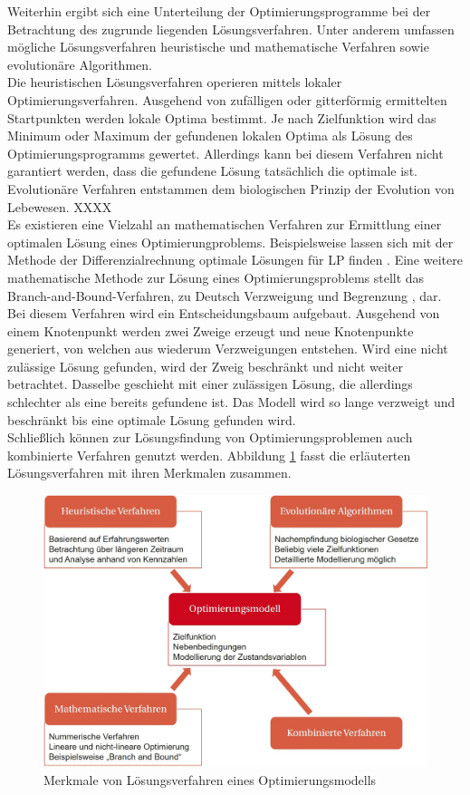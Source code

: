 Weiterhin ergibt sich eine Unterteilung der Optimierungsprogramme bei der Betrachtung des zugrunde liegenden Lösungsverfahren.
Unter anderem umfassen mögliche Lösungsverfahren heuristische und mathematische Verfahren sowie evolutionäre Algorithmen. \cite{Schellong.2016}\\
Die heuristischen Lösungsverfahren operieren mittels lokaler Optimierungsverfahren. 
Ausgehend von zufälligen oder gitterförmig ermittelten Startpunkten werden lokale Optima bestimmt.
Je nach Zielfunktion wird das Minimum oder Maximum der gefundenen lokalen Optima als Lösung des Optimierungsprogramms gewertet.
Allerdings kann bei diesem Verfahren nicht garantiert werden, dass die gefundene Lösung tatsächlich die optimale ist. \cite{Schellong.2016}\\
Evolutionäre Verfahren entstammen dem biologischen Prinzip der Evolution von Lebewesen.
XXXX \cite{Schellong.2016} \\
Es existieren eine Vielzahl an mathematischen Verfahren zur Ermittlung einer optimalen Lösung eines Optimierungproblems. 
Beispielsweise lassen sich mit der Methode der Differenzialrechnung optimale Lösungen für LP finden \cite{Schellong.2016}.
Eine weitere mathematische Methode zur Lösung eines Optimierungsproblems stellt das Branch-and-Bound-Verfahren, zu Deutsch \glqq Verzweigung und Begrenzung \grqq, dar.
Bei diesem Verfahren wird ein Entscheidungsbaum aufgebaut.
Ausgehend von einem Knotenpunkt werden zwei Zweige erzeugt und neue Knotenpunkte generiert, von welchen aus wiederum Verzweigungen entstehen.
Wird eine nicht zulässige Lösung gefunden, wird der Zweig beschränkt und nicht weiter betrachtet.
Dasselbe geschieht mit einer zulässigen Lösung, die allerdings schlechter als eine bereits gefundene ist.
Das Modell wird so lange verzweigt und beschränkt bis eine optimale Lösung gefunden wird.\cite{Dakin.1965} \\
Schließlich können zur Lösungsfindung von Optimierungsproblemen auch kombinierte Verfahren genutzt werden.
Abbildung \ref{fig: Abbildung311} fasst die erläuterten Lösungsverfahren mit ihren Merkmalen zusammen.

\begin{figure}[H]
	\centering
		\includegraphics{Pictures/Loesungsverfahren.jpg}
	\caption{Merkmale von Lösungsverfahren eines Optimierungsmodells \cite{Schellong.2016}}
	\label{fig: Abbildung311} 
\end{figure}

